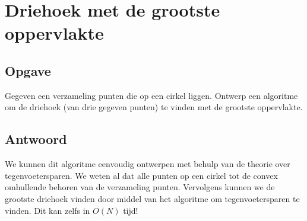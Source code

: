 \documentclass[examenvragen.tex]{subfiles}
\begin{document}
\section{Driehoek met de grootste oppervlakte}
\subsection{Opgave}
Gegeven een verzameling punten die op een cirkel liggen. Ontwerp een algoritme om de driehoek (van drie gegeven punten) te vinden met de grootste oppervlakte.

\subsection{Antwoord}
We kunnen dit algoritme eenvoudig ontwerpen met behulp van de theorie over tegenvoetersparen. We weten al dat alle punten op een cirkel tot de convex omhullende behoren van de verzameling punten. Vervolgens kunnen we de grootste driehoek vinden door middel van het algoritme om tegenvoetersparen te vinden. Dit kan zelfs in $O(N)$ tijd!
\end{document}
